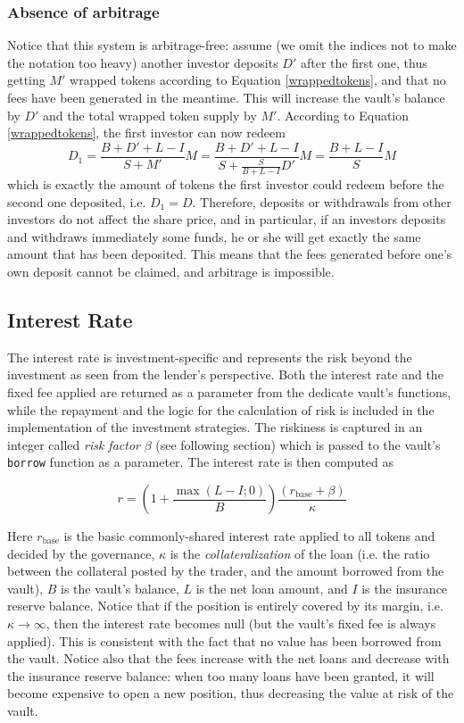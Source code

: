 \documentclass[a4paper,10 pt]{article}
\theoremstyle{definition}
\begin{document}
\subsubsection{Absence of arbitrage}
Notice that this system is arbitrage-free: assume (we omit the indices not to make the notation too heavy) another investor deposits $D'$ after the first one, thus getting $M'$ wrapped tokens according to Equation \eqref{wrappedtokens}, and that no fees have been generated in the meantime. This will increase the vault's balance by $D'$ and the total wrapped token supply by $M'$. According to Equation \eqref{wrappedtokens}, the first investor can now redeem
\begin{equation}D_1 = \frac{B+D'+L-I}{S+M'}M = \frac{B+D'+L-I}{S+\frac{S}{B+L-I}D'}M = \frac{B+L-I}{S}M \end{equation}
which is exactly the amount of tokens the first investor could redeem before the second one deposited, i.e. $D_1 = D$. Therefore, deposits or withdrawals from other investors do not affect the share price, and in particular, if an investors deposits and withdraws immediately some funds, he or she will get exactly the same amount that has been deposited. This means that the fees generated before one's own deposit cannot be claimed, and arbitrage is impossible.

\subsection{Interest Rate}

The interest rate is investment-specific and represents the risk beyond the investment as seen from the lender's perspective.
Both the interest rate and the fixed fee applied are returned as a parameter from the dedicate vault’s functions, while the repayment and the logic for the calculation of risk is included in the implementation of the investment strategies. The riskiness is captured in an integer called {\it risk factor} $\beta$ (see following section) which is passed to the vault's \verb|borrow| function as a parameter. The interest rate is then computed as

\begin{equation}\label{interestrate}r =  \left(1+\frac{\max{(L-I;0)}}{B}\right)\frac{(r_{\text{base}} + \beta)}{\kappa}\end{equation}

Here $r_{\text{base}}$ is the basic commonly-shared interest rate applied to all tokens and decided by the governance, $\kappa$ is the {\it collateralization} of the loan (i.e. the ratio between the collateral posted by the trader, and the amount borrowed from the vault), $B$ is the vault's balance, $L$ is the net loan amount, and $I$ is the insurance reserve balance. Notice that if the position is entirely covered by its margin, i.e. $\kappa \rightarrow \infty$, then the interest rate becomes null (but the vault's fixed fee is always applied). This is consistent with the fact that no value has been borrowed from the vault. Notice also that the fees increase with the net loans and decrease with the insurance reserve balance: when too many loans have been granted, it will become expensive to open a new position, thus decreasing the value at risk of the vault.
\end{document}
